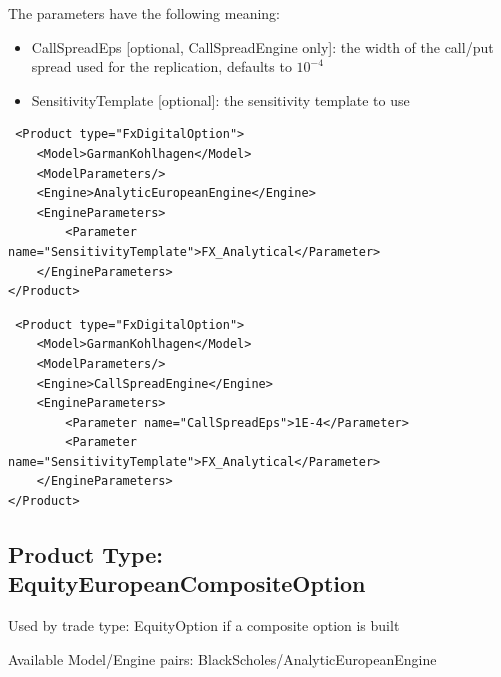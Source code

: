 The parameters have the following meaning:

\begin{itemize}
\item CallSpreadEps [optional, CallSpreadEngine only]: the width of the call/put spread used for the replication,
  defaults to $10^{-4}$
\item SensitivityTemplate [optional]: the sensitivity template to use
\end{itemize}

\begin{longlisting}
\begin{verbatim}
 <Product type="FxDigitalOption">
    <Model>GarmanKohlhagen</Model>
    <ModelParameters/>
    <Engine>AnalyticEuropeanEngine</Engine>
    <EngineParameters>
        <Parameter name="SensitivityTemplate">FX_Analytical</Parameter>
    </EngineParameters>
</Product>
\end{verbatim}
\caption{Configuration for Product FxDigitalOption, Model GarmanKohlhagen, Engine AnalyticEuropeanEngine}
\label{lst:peconfig_FxDigitalOption_GarmanKohlhagen_AnalyticEuropeanEngine}
\end{longlisting}

\begin{longlisting}
\begin{verbatim}
 <Product type="FxDigitalOption">
    <Model>GarmanKohlhagen</Model>
    <ModelParameters/>
    <Engine>CallSpreadEngine</Engine>
    <EngineParameters>
        <Parameter name="CallSpreadEps">1E-4</Parameter>
        <Parameter name="SensitivityTemplate">FX_Analytical</Parameter>
    </EngineParameters>
</Product>
\end{verbatim}
\caption{Configuration for Product FxDigitalOption, Model GarmanKohlhagen, Engine CallSpreadEngine}
\label{lst:peconfig_FxDigitalOption_GarmanKohlhagen_CallSpreadEngine}
\end{longlisting}

\subsection{Product Type: EquityEuropeanCompositeOption}

Used by trade type: EquityOption if a composite option is built

Available Model/Engine pairs: BlackScholes/AnalyticEuropeanEngine

